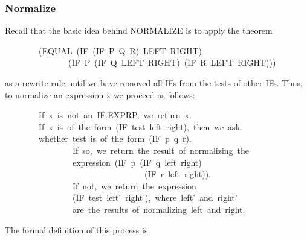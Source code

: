 \documentclass[11pt]{book}
\newenvironment{pubasis}{\begin{flushleft}\ttfamily\small}{\normalsize\rmfamily\end{flushleft}}
\newcommand{\pubdefaulttextsize}{\large}
\begin{document}
\subsubsection{Normalize}
\pubdefaulttextsize
 Recall that the basic idea behind NORMALIZE is to apply the
theorem
\begin{pubasis}
~~~~~~~~(EQUAL~(IF~(IF~P~Q~R)~LEFT~RIGHT)\\
~~~~~~~~~~~~~~~(IF~P~(IF~Q~LEFT~RIGHT)~(IF~R~LEFT~RIGHT)))\\
\end{pubasis}
as a rewrite rule until we have removed all IFs from the tests
of other IFs.  Thus, to
normalize an expression x we proceed as follows:
\begin{pubasis}
~~~~~~~~If~x~is~not~an~IF.EXPRP,~we~return~x.\\

~~~~~~~~If~x~is~of~the~form~(IF~test~left~right),~then~we~ask\\
~~~~~~~~whether~test~is~of~the~form~(IF~p~q~r).\\

~~~~~~~~~~~~~~~~If~so,~we~return~the~result~of~normalizing~the\\
~~~~~~~~~~~~~~~~expression~(IF~p~(IF~q~left~right)\\
~~~~~~~~~~~~~~~~~~~~~~~~~~~~~~~~~(IF~r~left~right)).\\

~~~~~~~~~~~~~~~~If~not,~we~return~the~expression\\
~~~~~~~~~~~~~~~~(IF~test~left'~right'),~where~left'~and~right'\\
~~~~~~~~~~~~~~~~are~the~results~of~normalizing~left~and~right.\\
\end{pubasis}
The formal definition of this process is:
\end{document}
